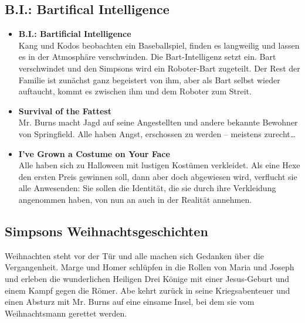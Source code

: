 \subsection{B.I.: Bartifical Intelligence}
\begin{itemize}
  \item \textbf{B.I.: Bartificial Intelligence}\\ Kang und Kodos beobachten ein Baseballspiel, finden es langweilig und lassen es in der Atmosphäre verschwinden. Die Bart-Intelligenz setzt ein. Bart verschwindet und den Simpsons wird ein Roboter-Bart zugeteilt. Der Rest der Familie ist zunächst ganz begeistert von ihm, aber als Bart selbst wieder auftaucht, kommt es zwischen ihm und dem Roboter zum Streit.
  \item \textbf{Survival of the Fattest}\\ Mr. Burns macht Jagd auf seine Angestellten und andere bekannte Bewohner von Springfield. Alle haben Angst, erschossen zu werden -- meistens zurecht\dots
  \item \textbf{I've Grown a Costume on Your Face}\\ Alle haben sich zu Halloween mit lustigen Kostümen verkleidet. Als eine Hexe den ersten Preis gewinnen soll, dann aber doch abgewiesen wird, verflucht sie alle Anwesenden: Sie sollen die Identität, die sie durch ihre Verkleidung angenommen haben, von nun an auch in der Realität annehmen.
\end{itemize}


\subsection{Simpsons Weihnachtsgeschichten}
Weihnachten steht vor der Tür und alle machen sich Gedanken über die Vergangenheit. Marge und Homer schlüpfen in die Rollen von Maria und Joseph und erleben die wunderlichen Heiligen Drei Könige mit einer Jesus-Geburt und einem Kampf gegen die Römer. Abe kehrt zurück in seine Kriegsabenteuer und einen Absturz mit Mr. Burns auf eine einsame Insel, bei dem sie vom Weihnachtsmann gerettet werden.



